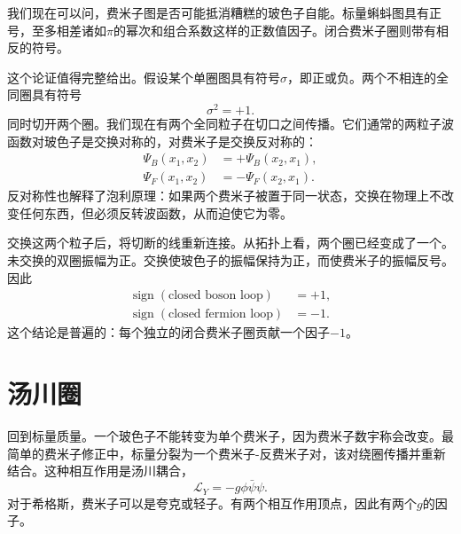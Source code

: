 我们现在可以问，费米子图是否可能抵消糟糕的玻色子自能。标量蝌蚪图具有正号，至多相差诸如\(\pi\)的幂次和组合系数这样的正数值因子。闭合费米子圈则带有相反的符号。

\begin{classroomqa}
\end{classroomqa}

这个论证值得完整给出。假设某个单圈图具有符号\(\sigma\)，即正或负。两个不相连的全同圈具有符号
\begin{equation}
\sigma^2=+1.
\end{equation}
同时切开两个圈。我们现在有两个全同粒子在切口之间传播。它们通常的两粒子波函数对玻色子是交换对称的，对费米子是交换反对称的：
\begin{align}
\Psi_B(x_1,x_2)&=+\Psi_B(x_2,x_1),\\
\Psi_F(x_1,x_2)&=-\Psi_F(x_2,x_1).
\end{align}
反对称性也解释了泡利原理：如果两个费米子被置于同一状态，交换在物理上不改变任何东西，但必须反转波函数，从而迫使它为零。

交换这两个粒子后，将切断的线重新连接。从拓扑上看，两个圈已经变成了一个。未交换的双圈振幅为正。交换使玻色子的振幅保持为正，而使费米子的振幅反号。因此
\begin{equation}
\begin{aligned}
\operatorname{sign}(\text{closed boson loop})&=+1,\\
\operatorname{sign}(\text{closed fermion loop})&=-1.
\end{aligned}
\end{equation}
这个结论是普遍的：每个独立的闭合费米子圈贡献一个因子\(-1\)。

\section{汤川圈}

回到标量质量。一个玻色子不能转变为单个费米子，因为费米子数宇称会改变。最简单的费米子修正中，标量分裂为一个费米子-反费米子对，该对绕圈传播并重新结合。这种相互作用是汤川耦合，
\begin{equation}
\mathcal L_Y=-g\phi\bar\psi\psi.
\end{equation}
对于希格斯，费米子可以是夸克或轻子。有两个相互作用顶点，因此有两个\(g\)的因子。

